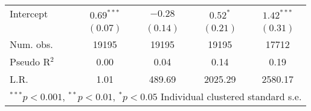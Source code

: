 \begin{table}
\begin{center}
\begin{tabular}{l c c c c }
Intercept       & $0.69^{***}$ & $-0.28$      & $0.52^{*}$    & $1.42^{***}$  \\
                & $(0.07)$     & $(0.14)$     & $(0.21)$      & $(0.31)$      \\
\hline
Num. obs.       & 19195        & 19195        & 19195         & 17712         \\
Pseudo R$^2$    & 0.00         & 0.04         & 0.14          & 0.19          \\
L.R.            & 1.01         & 489.69       & 2025.29       & 2580.17       \\
\hline
\multicolumn{5}{l}{\scriptsize{$^{***}p<0.001$, $^{**}p<0.01$, $^*p<0.05$ Individual clustered standard s.e.}}
\end{tabular}
\label{table:main_glm_models}
\end{center}
\end{table}
